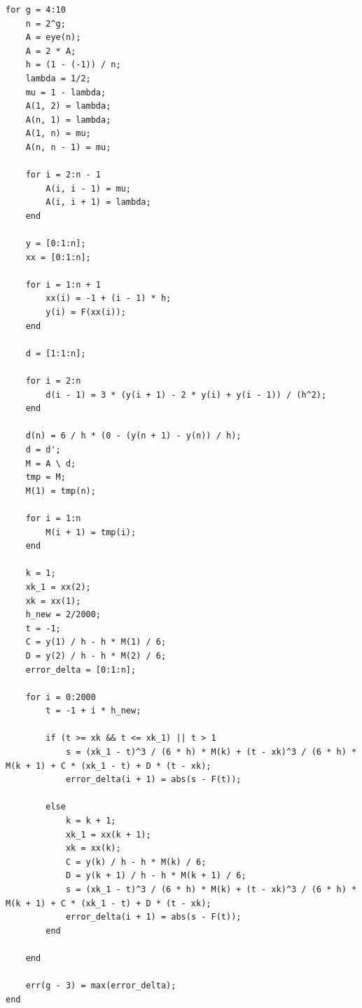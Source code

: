 \documentclass[12pt,a4paper,UTF8]{ctexart}
\theoremstyle{nonumberplain}
\begin{document}
\begin{enumerate}
\begin{enumerate}
\begin{lstlisting}[frame=single]
for g = 4:10
    n = 2^g;
    A = eye(n);
    A = 2 * A;
    h = (1 - (-1)) / n;
    lambda = 1/2;
    mu = 1 - lambda;
    A(1, 2) = lambda;
    A(n, 1) = lambda;
    A(1, n) = mu;
    A(n, n - 1) = mu;

    for i = 2:n - 1
        A(i, i - 1) = mu;
        A(i, i + 1) = lambda;
    end

    y = [0:1:n];
    xx = [0:1:n];

    for i = 1:n + 1
        xx(i) = -1 + (i - 1) * h;
        y(i) = F(xx(i));
    end

    d = [1:1:n];

    for i = 2:n
        d(i - 1) = 3 * (y(i + 1) - 2 * y(i) + y(i - 1)) / (h^2);
    end

    d(n) = 6 / h * (0 - (y(n + 1) - y(n)) / h);
    d = d';
    M = A \ d;
    tmp = M;
    M(1) = tmp(n);

    for i = 1:n
        M(i + 1) = tmp(i);
    end

    k = 1;
    xk_1 = xx(2);
    xk = xx(1);
    h_new = 2/2000;
    t = -1;
    C = y(1) / h - h * M(1) / 6;
    D = y(2) / h - h * M(2) / 6;
    error_delta = [0:1:n];

    for i = 0:2000
        t = -1 + i * h_new;

        if (t >= xk && t <= xk_1) || t > 1
            s = (xk_1 - t)^3 / (6 * h) * M(k) + (t - xk)^3 / (6 * h) * M(k + 1) + C * (xk_1 - t) + D * (t - xk);
            error_delta(i + 1) = abs(s - F(t));

        else
            k = k + 1;
            xk_1 = xx(k + 1);
            xk = xx(k);
            C = y(k) / h - h * M(k) / 6;
            D = y(k + 1) / h - h * M(k + 1) / 6;
            s = (xk_1 - t)^3 / (6 * h) * M(k) + (t - xk)^3 / (6 * h) * M(k + 1) + C * (xk_1 - t) + D * (t - xk);
            error_delta(i + 1) = abs(s - F(t));
        end

    end

    err(g - 3) = max(error_delta);
end


\end{lstlisting}
\end{enumerate}
\end{enumerate}
\end{document}
